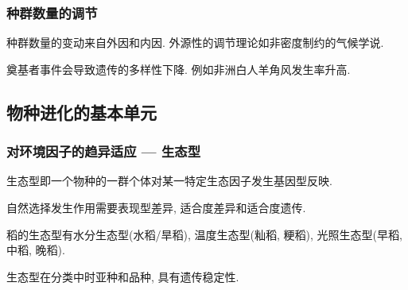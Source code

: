 \documentclass{ctexart}
\begin{document}
\subsubsection{种群数量的调节} %
\label{ssub:种群数量的调节}

种群数量的变动来自外因和内因. 外源性的调节理论如非密度制约的气候学说.


\par
奠基者事件会导致遗传的多样性下降. 例如非洲白人羊角风发生率升高.


\subsection{物种进化的基本单元} %
\label{sub:物种进化的基本单元}

\subsubsection{对环境因子的趋异适应 --- 生态型} %
\label{ssub:对环境因子的趋异适应_生态型}

生态型即一个物种的一群个体对某一特定生态因子发生基因型反映.
\par
自然选择发生作用需要表现型差异, 适合度差异和适合度遗传.
\begin{ex}
    稻的生态型有水分生态型(水稻/旱稻), 温度生态型(籼稻, 粳稻), 光照生态型(早稻, 中稻, 晚稻).
\end{ex}
生态型在分类中时亚种和品种, 具有遗传稳定性.



\end{document}
